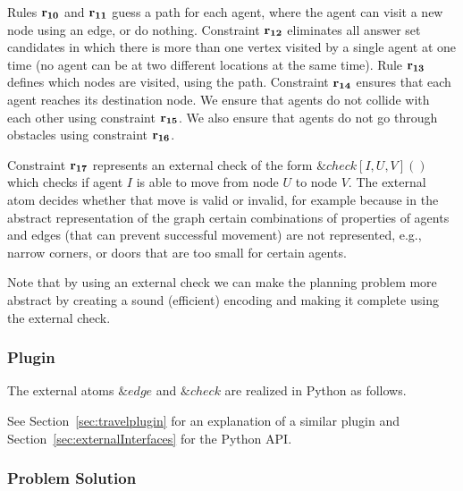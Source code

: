 \documentclass[a4paper, titlepage]{article}
\newcommand{\mi}[1]{\mathit{#1}}
\newcommand{\row}[1]{%
  \ensuremath{\color{black}\ensuremath{\mathbf{#1}} \color{black}}%
}
\begin{document}
Rules $\row{r_{10}}$ and $\row{r_{11}}$
guess a path for each agent,
where the agent can visit a new node using an edge,
or do nothing.
%
Constraint $\row{r_{12}}$ eliminates all answer set candidates
in which there is more than one vertex visited by a single agent at one time
(no agent can be at two different locations at the same time).
%
Rule $\row{r_{13}}$ defines which nodes are visited, using the path.
Constraint $\row{r_{14}}$ ensures that
each agent reaches its destination node. We ensure that 
agents do not collide with each other using constraint 
$\row{r_{15}}$. We also ensure that agents do not go through 
obstacles using constraint $\row{r_{16}}$. 

Constraint $\row{r_{17}}$
represents an external check of the form $\mi{\&check[I,U,V]()}$ which checks
if agent $I$ is able to move from node $U$ to node $V$.
The external atom decides whether that move is valid or invalid,
for example because in the abstract representation of the graph
certain combinations of properties of agents and edges
(that can prevent successful movement)
are not represented,
e.g., narrow corners, or doors that are too small for certain agents.

Note that by using an external check we
can make the planning problem more abstract
by creating a sound (efficient) encoding
and making it complete using the external check.

\subsubsection{Plugin} 

The external atoms $\&edge$ and $\&check$ are realized in Python as follows.



\noindent
See Section~\ref{sec:travelplugin}
for an explanation of a similar plugin
and Section~\ref{sec:externalInterfaces} for the Python API.

\subsubsection{Problem Solution} 
\end{document}
